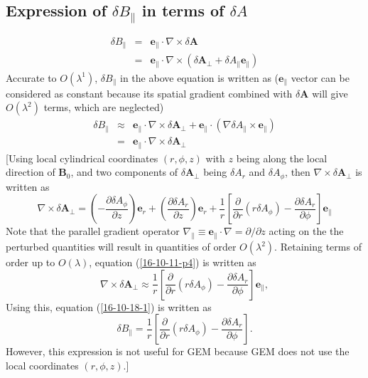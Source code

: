 \documentclass{article}
\begin{document}
\subsection{Expression of $\delta B_{\parallel}$ in terms of $\delta A$}

\begin{eqnarray}
  \delta B_{\parallel} & = & \mathbf{e}_{\parallel} \cdot \nabla \times \delta
  \mathbf{A} \nonumber\\
  & = & \mathbf{e}_{\parallel} \cdot \nabla \times (\delta \mathbf{A}_{\perp}
  + \delta A_{\parallel} \mathbf{e}_{\parallel}) 
\end{eqnarray}
Accurate to $O (\lambda^1)$, $\delta B_{\parallel}$ in the above equation is
written as ($\mathbf{e}_{\parallel}$ vector can be considered as constant
because its spatial gradient combined with $\delta \mathbf{A}$ will give $O
(\lambda^2)$ terms, which are neglected)
\begin{eqnarray}
  \delta B_{\parallel} & \approx & \mathbf{e}_{\parallel} \cdot \nabla \times
  \delta \mathbf{A}_{\perp} +\mathbf{e}_{\parallel} \cdot (\nabla \delta
  A_{\parallel} \times \mathbf{e}_{\parallel}) \nonumber\\
  & = & \mathbf{e}_{\parallel} \cdot \nabla \times \delta \mathbf{A}_{\perp} 
  \label{16-10-18-1}
\end{eqnarray}
[Using local cylindrical coordinates $(r, \phi, z)$ with $z$ being along the
local direction of $\mathbf{B}_0$, and two components of $\delta
\mathbf{A}_{\perp}$ being $\delta A_r$ and $\delta A_{\phi}$, then $\nabla
\times \delta \mathbf{A}_{\perp}$ is written as
\begin{equation}
  \nabla \times \delta \mathbf{A}_{\perp} = \left( - \frac{\partial \delta
  A_{\phi}}{\partial z} \right) \mathbf{e}_r + \left(  \frac{\partial \delta
  A_r}{\partial z} \right) \mathbf{e}_r + \frac{1}{r} \left[ 
  \frac{\partial}{\partial r} (r \delta A_{\phi}) - \frac{\partial \delta
  A_r}{\partial \phi} \right] \mathbf{e}_{\parallel}
\end{equation}
Note that the parallel gradient operator $\nabla_{\parallel} \equiv
\mathbf{e}_{\parallel} \cdot \nabla = \partial / \partial z$ acting on the the
perturbed quantities will result in quantities of order $O (\lambda^2)$.
Retaining terms of order up to $O (\lambda)$, equation (\ref{16-10-11-p4}) is
written as
\begin{equation}
  \nabla \times \delta \mathbf{A}_{\perp} \approx \frac{1}{r} \left[ 
  \frac{\partial}{\partial r} (r \delta A_{\phi}) - \frac{\partial \delta
  A_r}{\partial \phi} \right] \mathbf{e}_{\parallel},
\end{equation}
Using this, equation (\ref{16-10-18-1}) is written as
\begin{equation}
  \delta B_{\parallel} = \frac{1}{r} \left[  \frac{\partial}{\partial r} (r
  \delta A_{\phi}) - \frac{\partial \delta A_r}{\partial \phi} \right] .
\end{equation}
However, this expression is not useful for GEM because GEM does not use the
local coordinates $(r, \phi, z)$.]
\end{document}
